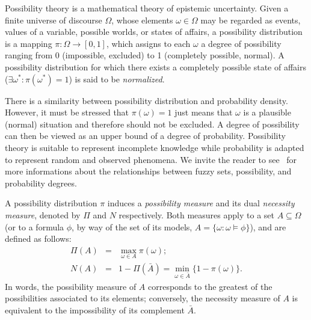 \documentclass[a4paper]{article}
\newcounter{ex}
\begin{document}
Possibility theory \cite{Zadeh1978} is a mathematical theory of epistemic uncertainty.
Given a finite universe of discourse $\Omega$, whose elements $\omega\in\Omega$
may be regarded as events, values of a variable, possible worlds, or states of affairs,
a possibility distribution is a mapping $\pi: \Omega \to [0, 1]$,
which assigns to each $\omega$ a degree of possibility ranging from 0 (impossible,
excluded) to 1 (completely possible, normal).
A possibility distribution for  which there exists a completely possible state of
affairs ($\exists \omega^*: \pi(\omega^*) = 1$) is said to be \emph{normalized}.

There is a similarity between possibility distribution and probability 
density. However, it must be stressed that $\pi(\omega) = 1$ just means that
$\omega$ is a plausible (normal) situation and therefore should not be excluded.
A degree of possibility can then be viewed as an upper bound of a degree of probability.
Possibility theory is suitable to represent incomplete knowledge while 
probability is adapted to represent random and observed phenomena. 
We invite the reader to see~\cite{dubois1991} for more informations
about the relationships between fuzzy sets, possibility, and probability 
degrees.

A possibility distribution $\pi$ induces a \emph{possibility
measure} and its dual \emph{necessity
measure}, denoted by $\Pi$ and $N$
respectively. Both measures apply to a set $A \subseteq\Omega$ (or to a
formula $\phi$, by way of the set of its models, $A = \{\omega : \omega \models \phi\}$),
and are defined as follows:
\begin{eqnarray}
  \Pi(A) &=& \max_{\omega\in A} \pi(\omega); \\
  N(A)   &=& 1 - \Pi(\bar{A}) = \min_{\omega\in \bar{A}} \{1 - \pi(\omega)\}.
\end{eqnarray}
In words, the possibility measure of $A$ corresponds to the
greatest of the possibilities associated to its elements; conversely,
the necessity measure of $A$ is equivalent to the impossibility of
its complement $\bar{A}$.
\end{document}

